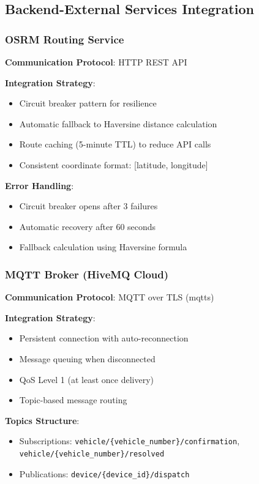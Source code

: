 \subsection{Backend-External Services Integration}

\subsubsection{OSRM Routing Service}

\textbf{Communication Protocol}: HTTP REST API

\textbf{Integration Strategy}:
\begin{itemize}
    \item Circuit breaker pattern for resilience
    \item Automatic fallback to Haversine distance calculation
    \item Route caching (5-minute TTL) to reduce API calls
    \item Consistent coordinate format: [latitude, longitude]
\end{itemize}

\textbf{Error Handling}:
\begin{itemize}
    \item Circuit breaker opens after 3 failures
    \item Automatic recovery after 60 seconds
    \item Fallback calculation using Haversine formula
\end{itemize}

\subsubsection{MQTT Broker (HiveMQ Cloud)}

\textbf{Communication Protocol}: MQTT over TLS (mqtts)

\textbf{Integration Strategy}:
\begin{itemize}
    \item Persistent connection with auto-reconnection
    \item Message queuing when disconnected
    \item QoS Level 1 (at least once delivery)
    \item Topic-based message routing
\end{itemize}

\textbf{Topics Structure}:
\begin{itemize}
    \item Subscriptions: \texttt{vehicle/\{vehicle\_number\}/confirmation}, \texttt{vehicle/\{vehicle\_number\}/resolved}
    \item Publications: \texttt{device/\{device\_id\}/dispatch}
\end{itemize}

